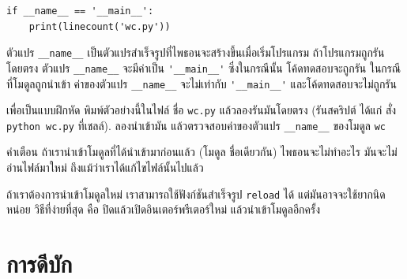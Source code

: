 \begin{verbatim}
if __name__ == '__main__':
    print(linecount('wc.py'))
\end{verbatim}
%
%
ตัวแปร \verb|__name__| เป็นตัวแปรสำเร็จรูปที่ไพธอนจะสร้างขึ้นเมื่อเริ่มโปรแกรม
ถ้าโปรแกรมถูกรันโดยตรง ตัวแปร \verb|__name__| จะมีค่าเป็น \verb|'__main__'|
ซึ่งในกรณีนั้น โค้ดทดสอบจะถูกรัน
ในกรณีที่โมดูลถูกนำเข้า ค่าของตัวแปร \verb|__name__| จะไม่เท่ากับ \verb|'__main__'| และโค้ดทดสอบจะไม่ถูกรัน


เพื่อเป็นแบบฝึกหัด พิมพ์ตัวอย่างนี้ในไฟล์ ชื่อ \texttt{wc.py}
แล้วลองรันมันโดยตรง (รันสคริปต์ ได้แก่ สั่ง \texttt{python wc.py} ที่เชลล์).
ลองนำเข้ามัน แล้วตรวจสอบค่าของตัวแปร \verb|__name__| ของโมดูล \texttt{wc}


คำเตือน ถ้าเรานำเข้าโมดูลที่ได้นำเข้ามาก่อนแล้ว (โมดูล ชื่อเดียวกัน)
ไพธอนจะไม่ทำอะไร
มันจะไม่อ่านไฟล์มาใหม่ ถึงแม้ว่าเราได้แก้ไขไฟล์นั้นไปแล้ว


ถ้าเราต้องการนำเข้าโมดูลใหม่
เราสามารถใช้ฟังก์ชันสำเร็จรูป \texttt{reload} ได้
แต่มันอาจจะใช้ยากนิดหน่อย 
วิธีที่ง่ายที่สุด คือ ปิดแล้วเปิดอินเตอร์พรีเตอร์ใหม่ แล้วนำเข้าโมดูลอีกครั้ง

\section{การดีบัก}

